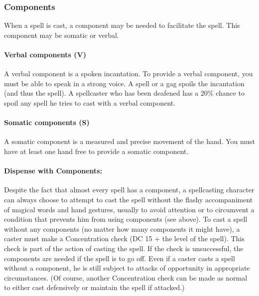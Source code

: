 \subsubsection{Components}
\label{sec:Components}
When a spell is cast, a component may be needed to facilitate the spell. This component may be somatic or verbal.

\paragraph{Verbal components (V)} A verbal component is a spoken incantation. 
To provide a verbal component, you must be able to speak in a strong voice. 
A  spell or a gag spoils the incantation (and thus the spell). 
A spellcaster who has been deafened has a 20\% chance to spoil any spell he tries to cast with a verbal component.

\paragraph{Somatic components (S)} A somatic component is a measured and precise movement of the hand. 
You must have at least one hand free to provide a somatic component.

\paragraph{Dispense with Components:} Despite the fact that almost every spell has a component, a spellcasting character can always choose to attempt to cast the spell without the flashy accompaniment of magical words and hand gestures, usually to avoid attention or to circumvent a condition that prevents him from using components (see above). 
To cast a spell without any components (no matter how many components it might have), a caster must make a Concentration check (DC 15 + the level of the spell).
This check is part of the action of casting the spell. If the check is unsuccessful, the components are needed if the spell is to go off.
Even if a caster casts a spell without a component, he is still subject to attacks of opportunity in appropriate circumstances. 
(Of course, another Concentration check can be made as normal to either cast defensively or maintain the spell if attacked.)

